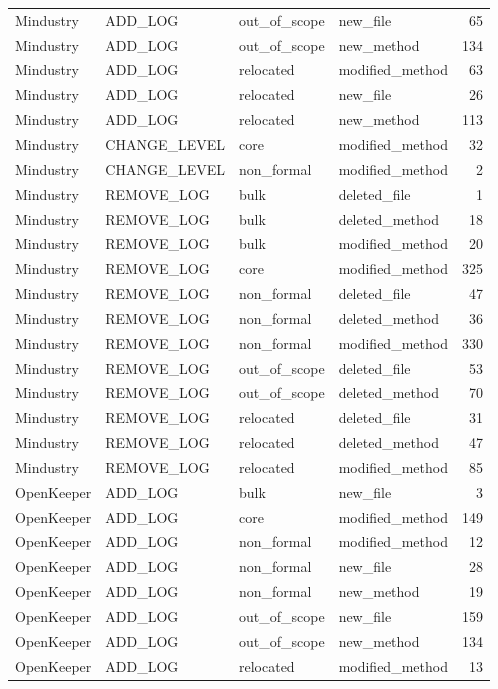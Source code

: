 {\begin{longtable}{llllr}
Mindustry & ADD\_LOG & out\_of\_scope & new\_file & 65 \\
Mindustry & ADD\_LOG & out\_of\_scope & new\_method & 134 \\
Mindustry & ADD\_LOG & relocated & modified\_method & 63 \\
Mindustry & ADD\_LOG & relocated & new\_file & 26 \\
Mindustry & ADD\_LOG & relocated & new\_method & 113 \\
Mindustry & CHANGE\_LEVEL & core & modified\_method & 32 \\
Mindustry & CHANGE\_LEVEL & non\_formal & modified\_method & 2 \\
Mindustry & REMOVE\_LOG & bulk & deleted\_file & 1 \\
Mindustry & REMOVE\_LOG & bulk & deleted\_method & 18 \\
Mindustry & REMOVE\_LOG & bulk & modified\_method & 20 \\
Mindustry & REMOVE\_LOG & core & modified\_method & 325 \\
Mindustry & REMOVE\_LOG & non\_formal & deleted\_file & 47 \\
Mindustry & REMOVE\_LOG & non\_formal & deleted\_method & 36 \\
Mindustry & REMOVE\_LOG & non\_formal & modified\_method & 330 \\
Mindustry & REMOVE\_LOG & out\_of\_scope & deleted\_file & 53 \\
Mindustry & REMOVE\_LOG & out\_of\_scope & deleted\_method & 70 \\
Mindustry & REMOVE\_LOG & relocated & deleted\_file & 31 \\
Mindustry & REMOVE\_LOG & relocated & deleted\_method & 47 \\
Mindustry & REMOVE\_LOG & relocated & modified\_method & 85 \\
OpenKeeper & ADD\_LOG & bulk & new\_file & 3 \\
OpenKeeper & ADD\_LOG & core & modified\_method & 149 \\
OpenKeeper & ADD\_LOG & non\_formal & modified\_method & 12 \\
OpenKeeper & ADD\_LOG & non\_formal & new\_file & 28 \\
OpenKeeper & ADD\_LOG & non\_formal & new\_method & 19 \\
OpenKeeper & ADD\_LOG & out\_of\_scope & new\_file & 159 \\
OpenKeeper & ADD\_LOG & out\_of\_scope & new\_method & 134 \\
OpenKeeper & ADD\_LOG & relocated & modified\_method & 13 \\

\end{longtable}}
